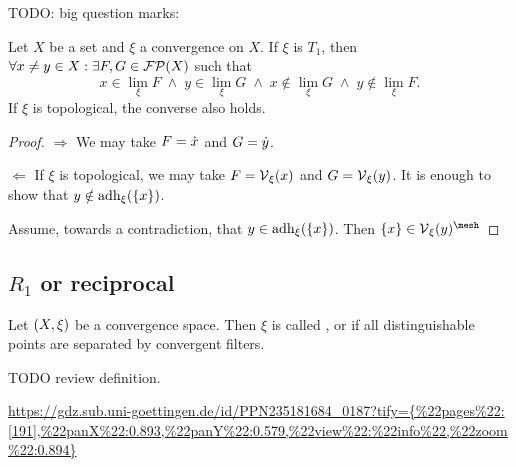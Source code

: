 TODO: big question marks:
\begin{proposition}
Let $X$ be a set and $\xi$ a convergence on $X$. If $\xi$ is $T_1$, then $\forall x\neq y\in X: \exists F,G\in \operatorname{\mathcal{FP}}(X)$ such that
\[ x\in \lim_\xi F \;\land\; y\in \lim_\xi G \;\land\; x\notin \lim_\xi G \;\land\; y\notin \lim_\xi F. \]
If $\xi$ is topological, the converse also holds.
\end{proposition}
\begin{proof}
$\Rightarrow$ We may take $F = \dot{x}$ and $G = \dot{y}$.

$\Leftarrow$ If $\xi$ is topological, we may take $F = \operatorname{\mathcal{V}}_\xi(x)$ and $G = \operatorname{\mathcal{V}}_\xi(y)$. It is enough to show that $y\notin \operatorname{adh}_\xi(\{x\})$.

Assume, towards a contradiction, that $y\in \operatorname{adh}_\xi(\{x\})$. Then $\{x\} \in \vicinity_\xi(y)^{\mesh}$
\end{proof}

\subsection{$R_1$ or reciprocal}
\begin{definition}
Let $\left( X,\xi \right)$ be a convergence space. Then $\xi$ is called ,  or  if all distinguishable points are separated by convergent filters.
\end{definition}
TODO review definition.

\url{https://gdz.sub.uni-goettingen.de/id/PPN235181684_0187?tify={%


